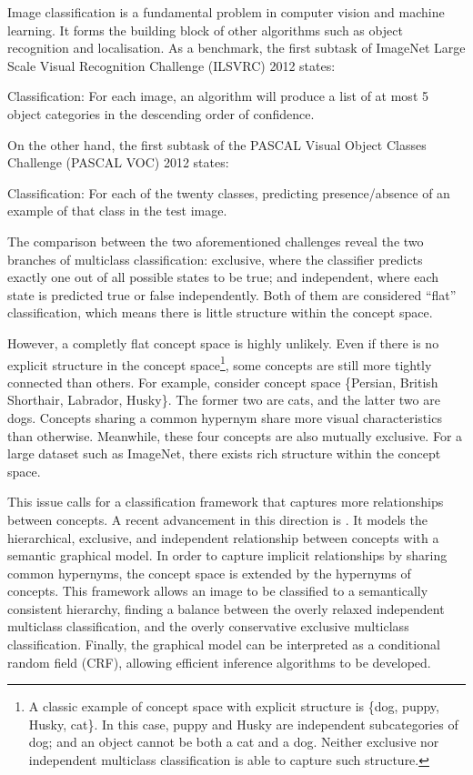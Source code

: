 \documentclass[11pt,a4paper]{book}
\begin{document}
Image classification is a fundamental problem in computer vision and machine learning. It forms the building block of other algorithms such as object recognition and localisation. As a benchmark, the first subtask of ImageNet Large Scale Visual Recognition Challenge (ILSVRC) 2012 \cite{ilsvrc15} states:
\begin{displayquote}
Classification: For each image, an algorithm will produce a list of at most 5 object categories in the descending order of confidence.
\end{displayquote}

On the other hand, the first subtask of the PASCAL Visual Object Classes Challenge (PASCAL VOC) 2012 \cite{pascal-voc-2012} states:
\begin{displayquote}
Classification: For each of the twenty classes, predicting presence/absence of an example of that class in the test image.
\end{displayquote}

The comparison between the two aforementioned challenges reveal the two branches of multiclass classification: exclusive, where the classifier predicts exactly one out of all possible states to be true; and independent, where each state is predicted true or false independently. Both of them are considered ``flat'' classification, which means there is little structure within the concept space.

However, a completly flat concept space is highly unlikely. Even if there is no explicit structure in the concept space\footnote{A classic example of concept space with explicit structure is \{dog, puppy, Husky, cat\}. In this case, puppy and Husky are independent subcategories of dog; and an object cannot be both a cat and a dog. Neither exclusive nor independent multiclass classification is able to capture such structure.}, some concepts are still more tightly connected than others. For example, consider concept space \{Persian, British Shorthair, Labrador, Husky\}. The former two are cats, and the latter two are dogs. Concepts sharing a common hypernym share more visual characteristics than otherwise. Meanwhile, these four concepts are also mutually exclusive. For a large dataset such as ImageNet, there exists rich structure within the concept space.

This issue calls for a classification framework that captures more relationships between concepts. A recent advancement in this direction is \cite{deng2014large}. It models the hierarchical, exclusive, and independent relationship between concepts with a semantic graphical model. In order to capture implicit relationships by sharing common hypernyms, the concept space is extended by the hypernyms of concepts. This framework allows an image to be classified to a semantically consistent hierarchy, finding a balance between the overly relaxed independent multiclass classification, and the overly conservative exclusive multiclass classification. Finally, the graphical model can be interpreted as a conditional random field (CRF), allowing efficient inference algorithms to be developed.
\end{document}
